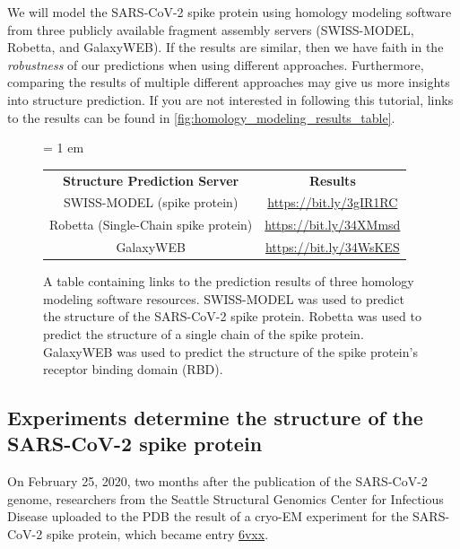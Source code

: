 We will model the SARS-CoV-2 spike protein using homology modeling software from three publicly available fragment assembly servers (SWISS-MODEL, Robetta, and GalaxyWEB). If the results are similar, then we have faith in the \textit{robustness} of our predictions when using different approaches. Furthermore, comparing the results of multiple different approaches may give us more insights into structure prediction. If you are not interested in following this tutorial, links to the results can be found in \autoref{fig:homology_modeling_results_table}.\\

\begin{figure}[h]
	\centering
	\tabcolsep = 1 em
	\mySfFamily
	\begin{tabular}{c c}
		\textbf{Structure Prediction Server} & \textbf{Results} \\
		SWISS-MODEL (spike protein) & \url{https://bit.ly/3gIR1RC} \\
		Robetta (Single-Chain spike protein) & \url{https://bit.ly/34XMmsd} \\
		GalaxyWEB & \url{https://bit.ly/34WsKES} \\
	\end{tabular}
	\caption{A table containing links to the prediction results of three homology modeling software resources. SWISS-MODEL was used to predict the structure of the SARS-CoV-2 spike protein. Robetta was used to predict the structure of a single chain of the spike protein. GalaxyWEB was used to predict the structure of the spike protein's receptor binding domain (RBD).}
	\label{fig:homology_modeling_results_table}
\end{figure}

\FloatBarrier

\subsection{Experiments determine the structure of the SARS-CoV-2 spike protein}

On February 25, 2020, two months after the publication of the SARS-CoV-2 genome, researchers from the Seattle Structural Genomics Center for Infectious Disease uploaded to the PDB the result of a cryo-EM experiment for the SARS-CoV-2 spike protein, which became entry \href{http://www.rcsb.org/structure/6VXX}{6vxx}.\\

\begin{note}\end{note}
	
